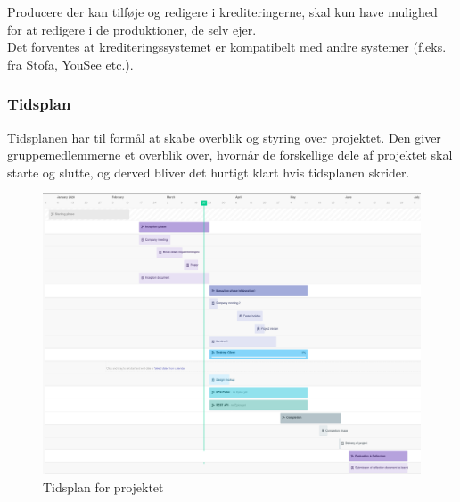 \noindent
Producere der kan tilføje og redigere i krediteringerne, skal kun have mulighed for at redigere i de produktioner, de selv ejer.\\
Det forventes at krediteringssystemet er kompatibelt med andre systemer (f.eks. fra Stofa, YouSee etc.).

\subsubsection{Tidsplan}
Tidsplanen har til formål at skabe overblik og styring over projektet. 
Den giver gruppemedlemmerne et overblik over, hvornår de forskellige dele af projektet skal starte og slutte, og derved bliver det hurtigt klart hvis tidsplanen skrider. \\

\begin{landscape}
    \begin{figure}
        \centering
        \includegraphics[scale=0.30]{figures/grantt_udvidet.png}
        \caption{Tidsplan for projektet}
        \label{fig:gantt}
    \end{figure}{}
\end{landscape}



